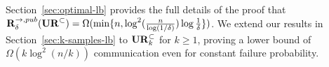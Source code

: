 
Section~\ref{sec:optimal-lb} provides the full details of the proof that $\mathbf{R}^{\rightarrow,pub}_\delta(\mathbf{UR}^\subset) = \Omega(\min\{n, \log^2(\frac n{\log(1/\delta)}) \log \frac{1}{\delta}\})$. We extend our results in Section~\ref{sec:k-samples-lb} to $\mathbf{UR}_k^\subset$ for $k\ge 1$, proving a lower bound of $\Omega(k\log^2(n/k))$ communication even for constant failure probability.
